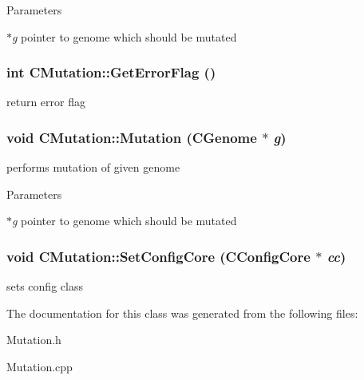 \begin{DoxyParams}{Parameters}
\item[{\em $\ast$g}]pointer to genome which should be mutated \end{DoxyParams}
\hypertarget{classCMutation_afa507d1edb86b5fdc33ec4e88b54ad71}{
\subsubsection[{GetErrorFlag}]{\setlength{\rightskip}{0pt plus 5cm}int CMutation::GetErrorFlag ()}}
\label{classCMutation_afa507d1edb86b5fdc33ec4e88b54ad71}
return error flag \hypertarget{classCMutation_a011d0153e14d5551a0bb1993e029fa75}{
\subsubsection[{Mutation}]{\setlength{\rightskip}{0pt plus 5cm}void CMutation::Mutation ({\bf CGenome} $\ast$ {\em g})}}
\label{classCMutation_a011d0153e14d5551a0bb1993e029fa75}
performs mutation of given genome


\begin{DoxyParams}{Parameters}
\item[{\em $\ast$g}]pointer to genome which should be mutated \end{DoxyParams}
\hypertarget{classCMutation_ae5d1555611f0c19de65c237d16ff3536}{
\subsubsection[{SetConfigCore}]{\setlength{\rightskip}{0pt plus 5cm}void CMutation::SetConfigCore ({\bf CConfigCore} $\ast$ {\em cc})}}
\label{classCMutation_ae5d1555611f0c19de65c237d16ff3536}
sets config class 

The documentation for this class was generated from the following files:\begin{DoxyCompactItemize}
\item 
Mutation.h\item 
Mutation.cpp\end{DoxyCompactItemize}
